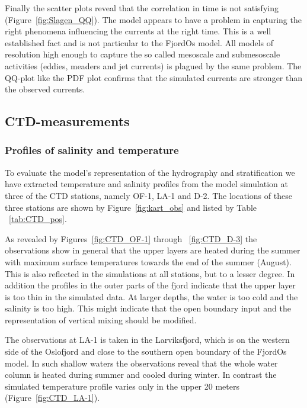 Finally the scatter plots reveal that the correlation in time is not satisfying (Figure~\ref{fig:Slagen_QQ}). The model appears to have a problem in capturing the right phenomena influencing the currents at the right time. This is a well established fact and is not particular to the FjordOs model. All models of resolution high enough to capture the so called mesoscale and submesoscale activities (eddies, meaders and jet currents) is plagued by the same problem. The QQ-plot like the PDF plot confirms that the simulated currents are stronger than the observed currents. 


\clearpage
\subsection{CTD-measurements}
\label{subsec:CTDe}
\subsubsection{Profiles of salinity and temperature}
\label{subsubsec:profi}
To evaluate the model's representation of the hydrography and stratification we have extracted temperature and salinity profiles from the model simulation at three of the CTD stations, namely OF-1, LA-1 and D-2. The locations of these three stations are shown by Figure~\ref{fig:kart_obs} and listed by Table ~\ref{tab:CTD_pos}. 

As revealed by Figures~\ref{fig:CTD_OF-1} through ~\ref{fig:CTD_D-3} the observations show in general that the upper layers are heated during the summer with maximum surface temperatures towards the end of the summer (August). This is also reflected in the simulations at all stations, but to a lesser degree. In addition the profiles in the outer parts of the fjord indicate that the upper layer is too thin in the simulated data. At larger depths, the water is too cold and the salinity is too high. This might indicate that the open boundary input and the representation of vertical mixing should be modified.
 

The observations at LA-1 is taken in the Larviksfjord, which is on the western side of the Oslofjord and close to the southern open boundary of the FjordOs model. In such shallow waters the observations reveal that the whole water column is heated during summer and cooled during winter. In contrast the simulated temperature profile varies only in the upper 20 meters (Figure~\ref{fig:CTD_LA-1}). 


